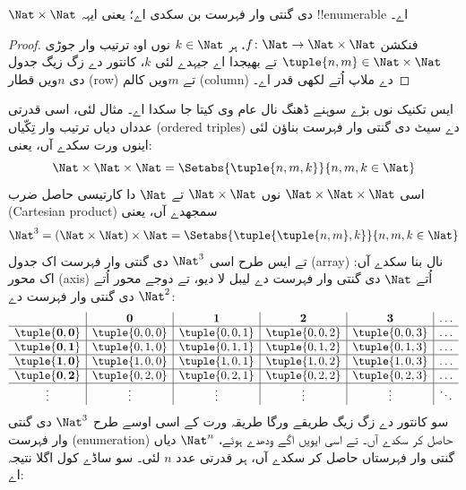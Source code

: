 \documentclass[../../../include/open-logic-section]{subfiles}
\begin{document}
\begin{prop}
$\Nat \times \Nat$ دی گنتی وار فہرست بن سکدی اے؛ یعنی ایہہ
!!{enumerable} اے۔
\end{prop}

\begin{proof}
فنکشن $f \colon \Nat \to \Nat\times\Nat$، ہر $k \in \Nat$ نوں اوہ
ترتیب وار جوڑی $\tuple{n,m} \in \Nat \times \Nat$ تے بھیجدا اے جیہدے
لئی $k$، کانتور دے زگ زیگ جدول دی $n$ویں قطار (row) تے $m$ویں کالم
(column) دے ملاپ اُتے لکھی قدر اے۔
\end{proof}

\begin{explain}
ایس تکنیک نوں بڑے سوہنے ڈھنگ نال عام وی کیتا جا سکدا اے۔ مثال لئی،
اسی قدرتی عدداں دیاں ترتیب وار تِکّیاں (ordered triples) دے سیٹ دی
گنتی وار فہرست بناؤن لئی اینوں ورت سکدے آں، یعنی:
\[
\Nat \times \Nat \times \Nat = \Setabs{\tuple{n,m,k}}{n,m,k \in \Nat}
\]
اسی $\Nat \times \Nat \times \Nat$ نوں $\Nat \times \Nat$ تے
$\Nat$ دا کارتیسی حاصل ضرب (Cartesian product) سمجھدے آں، یعنی
\[
\Nat^3 = (\Nat \times \Nat) \times \Nat =
\Setabs{\tuple{\tuple{n,m},k}}{n, m, k
  \in \Nat }
\]
تے ایس طرح اسی $\Nat^3$ دی گنتی وار فہرست اک جدول (array) نال بنا
سکدے آں: اک محور (axis) اُتے $\Nat$ دی گنتی وار فہرست دے لیبل لا
دیو، تے دوجے محور اُتے $\Nat^2$ دی گنتی وار فہرست دے:
\[
\begin{array}{ c | c | c | c | c | c}
& \mathbf 0 & \mathbf 1 & \mathbf 2 & \mathbf 3 & \dots \\
\hline
\mathbf{\tuple{0,0}} & \tuple{0,0,0} & \tuple{0,0,1} & \tuple{0,0,2} & \tuple{0,0,3} & \dots \\
\hline
\mathbf{\tuple{0,1}} & \tuple{0,1,0} & \tuple{0,1,1} & \tuple{0,1,2} & \tuple{0,1,3} & \dots \\
\hline
\mathbf{\tuple{1,0}} & \tuple{1,0,0} & \tuple{1,0,1} & \tuple{1,0,2} & \tuple{1,0,3} & \dots \\
\hline
\mathbf{\tuple{0,2}} & \tuple{0,2,0} & \tuple{0,2,1} & \tuple{0,2,2} & \tuple{0,2,3} & \dots\\
\hline
\vdots & \vdots & \vdots & \vdots & \vdots & \ddots \\
\end{array}
\]
سو کانتور دے زگ زیگ طریقے ورگا طریقہ ورت کے اسی اوسے طرح $\Nat^3$
دی گنتی وار فہرست (enumeration) حاصل کر سکدے آں۔ تے اسی ایویں اگے
ودھدے ہوئے، $\Nat^n$ دیاں گنتی وار فہرستاں حاصل کر سکدے آں، ہر قدرتی
عدد $n$ لئی۔ سو ساڈے کول اگلا نتیجہ اے:
\end{explain}
\end{document}
